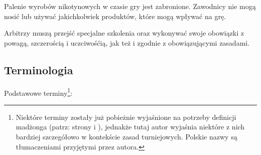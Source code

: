 Palenie wyrobów nikotynowych w czasie gry jest zabronione. Zawodnicy nie mogą
nosić lub używać jakichkolwiek produktów, które mogą wpływać na grę.

Arbitrzy muszą przejść specjalne szkolenia oraz wykonywać swoje obowiązki z
powagą, szczerością i uczciwośćią, jak też i zgodnie z obowiązującymi zasadami.

\pagebreak
\subsection{Terminologia}
\label{terminologia}
Podstawowe terminy\footnote{Niektóre terminy zostały już pobieżnie
wyjaśnione na potrzeby definicji madżonga (patrz: strony \pageref{zastrzezenia}
i \pageref{definicja}), jednakże tutaj autor wyjaśnia niektóre z nich bardziej
szczegółowo w kontekście zasad turniejowych. Polskie nazwy są tłumaczeniami
przyjętymi przez autora.}:
